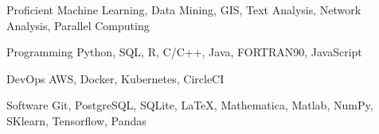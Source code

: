 

\begin{cvskills}

  \cvskill
    {Proficient} %
    {Machine Learning, Data Mining, GIS, Text Analysis, Network Analysis, Parallel Computing} %

  \cvskill
    {Programming} %
    {Python, SQL, R, C/C++, Java, FORTRAN90, JavaScript} %


    \cvskill
     {DevOps} %
     {AWS, Docker, Kubernetes, CircleCI} %


  \cvskill
    {Software} %
    {Git, PostgreSQL, SQLite, \LaTeX, Mathematica, Matlab, NumPy, SKlearn, Tensorflow, Pandas} %



\end{cvskills}
